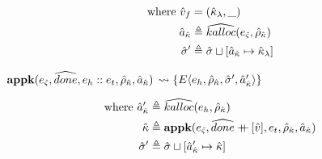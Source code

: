 \documentclass[12pt,draft]{article}
\newcommand\mdoubleplus{\ensuremath{\mathbin{+\mkern-9mu+}}}
\newcommand{\E}[4]{E\langle #1 , #2 , #3 , #4 \rangle}
\begin{document}
\begin{multicols*}{2}
\vspace{-7mm}
\begin{align*}
  \text{where }
  \hat{v}_f &= (\hat{\kappa}_{\lambda} , \_) \\
  \hat{a}_{\hat{\kappa}} &\triangleq \widehat{kalloc}(e_{\hat{\varsigma}} , \hat{\rho}_{\hat{\kappa}}) \\
  \hat{\sigma}' &\triangleq \hat{\sigma} \sqcup [\hat{a}_{\hat{\kappa}} \mapsto \hat{\kappa}_{\lambda}]
\end{align*}
\begin{center}
  $\textbf{appk}(e_{\hat{\varsigma}} , \widehat{done} , e_h::e_t , \hat{\rho}_{\hat{\kappa}} , \hat{a}_{\hat{\kappa}})$
  $\leadsto \{\E{e_h}{\aenv_{\akont}}{\astore'}{\akaddr'}\}$
\end{center}
\vspace{-7mm}
\begin{align*}
  \text{where }
  \akaddr' &\triangleq \akalloc{e_h , \aenv_{\akont}} \\
  \akont &\triangleq \textbf{appk}(\ectrl, \adone \mdoubleplus [\aval],
            e_t , \aenv_{\akont} , \akaddr) \\
  \astore' &\triangleq \astore \sqcup [\akaddr' \mapsto \akont]
\end{align*}
\end{multicols*}

\newpage
\newcommand{\cExp}[0]{\textsf{Exp}}
\newcommand{\cVar}[0]{\textsf{Var}}
\newcommand{\cCall}[0]{\textsf{Call}}
\newcommand{\cLam}[0]{\textsf{Lam}}
\newcommand{\cState}[0]{\Sigma}
\newcommand{\cstate}[0]{\varsigma}
\newcommand{\cStore}[0]{\textit{Store}}
\newcommand{\cBAddr}[0]{\textit{BAddr}}
\newcommand{\cKAddr}[0]{\textit{KAddr}}
\newcommand{\cVal}[0]{\textit{Val}}
\newcommand{\cKont}[0]{\textit{Kont}}
\newcommand{\ckont}[0]{\kappa}
\newcommand{\cEnv}[0]{\textit{Env}}
\newcommand{\cenv}[0]{\rho}
\newcommand{\cstore}[0]{\sigma}
\newcommand{\ckaddr}[0]{a_{\kappa}}
\newcommand{\cClo}[0]{\textit{Clo}}
\newcommand{\cinj}[0]{inj}
\newcommand{\cnewenv}[0]{new\rho}
\newcommand{\ccalllist}[0]{\overrightarrow{call}}
\end{document}

